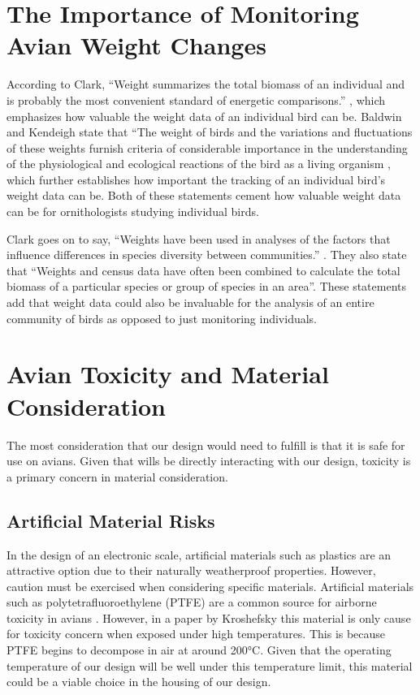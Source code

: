 \documentclass[class=report,11pt,crop=false]{standalone}
\begin{document}
\section{The Importance of Monitoring Avian Weight Changes}
According to Clark, “Weight summarizes the total biomass of an individual and is probably the most convenient standard of energetic comparisons.” \cite{ClarckWeights}, which emphasizes how valuable the weight data of an individual bird can be. Baldwin and Kendeigh state that “The weight of birds and the variations and fluctuations of these weights furnish criteria of considerable importance in the understanding of the physiological and ecological reactions of the bird as a living organism \cite{BaldwinWeights}, which further establishes how important the tracking of an individual bird’s weight data can be. Both of these statements cement how valuable weight data can be for ornithologists studying individual birds.

Clark goes on to say, “Weights have been used in analyses of the factors that influence differences in species diversity between communities.” \cite{ClarckWeights}. They also state that “Weights and census data have often been combined to calculate the total biomass of a particular species or group of species in an area”. These statements add that weight data could also be invaluable for the analysis of an entire community of birds as opposed to just monitoring individuals.

\section{Avian Toxicity and Material Consideration}
The most consideration that our design would need to fulfill is that it is safe for use on avians. Given that wills be directly interacting with our design, toxicity is a primary concern in material consideration. 

\subsection{Artificial Material Risks}
In the design of an electronic scale, artificial materials such as plastics are an attractive option due to their naturally weatherproof properties. However, caution must be exercised when considering specific materials. Artificial materials such as polytetrafluoroethylene (PTFE) are a common source for airborne toxicity in avians \cite{LightfootToxicity}. However, in a paper by Kroshefsky \cite{KroshefskyTeflon} this material is only cause for toxicity concern when exposed under high temperatures. This is because PTFE begins to decompose in air at around 200°C. Given that the operating temperature of our design will be well under this temperature limit, this material could be a viable choice in the housing of our design.
\end{document}
